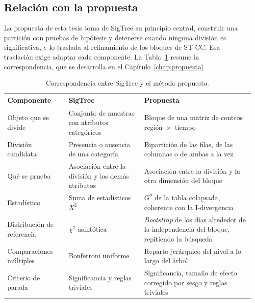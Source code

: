\subsection{Relación con la propuesta}\label{sec:sigtree-propuesta}

La propuesta de esta tesis toma de SigTree su principio central, construir una
partición con pruebas de hipótesis y detenerse cuando ninguna división es
significativa, y lo traslada al refinamiento de los bloques de ST-CC. Esa
traslación exige adaptar cada componente. La Tabla~\ref{tab:sigtree-astcc} resume
la correspondencia, que se desarrolla en el Capítulo~\ref{chap:propuesta}.

\begin{table}[ht]
  \centering
  {\footnotesize
  \begin{tabular}{@{}>{\raggedright\arraybackslash}p{}
                  >{\raggedright\arraybackslash}p{}
                  >{\raggedright\arraybackslash}p{}@{}}
    \toprule
    \textbf{Componente} & \textbf{SigTree} & \textbf{Propuesta} \\
    \midrule
    Objeto que se divide & Conjunto de muestras con atributos categóricos &
      Bloque de una matriz de conteos región~$\times$~tiempo \\
    División candidata & Presencia o ausencia de una categoría &
      Bipartición de las filas, de las columnas o de ambas a la vez \\
    Qué se prueba & Asociación entre la división y los demás atributos &
      Asociación entre la división y la otra dimensión del bloque \\
    Estadístico & Suma de estadísticos $X^2$ & $G^2$ de la tabla colapsada,
      coherente con la I-divergencia \\
    Distribución de referencia & $\chi^2$ asintótica & \emph{Bootstrap} de los días
      alrededor de la independencia del bloque, repitiendo la búsqueda \\
    Comparaciones múltiples & Bonferroni uniforme & Reparto jerárquico del nivel
      a lo largo del árbol \\
    Criterio de parada & Significancia y reglas triviales & Significancia, tamaño
      de efecto corregido por sesgo y reglas triviales \\
    \bottomrule
  \end{tabular}
  }
  \caption{Correspondencia entre SigTree \cite{Hu2025} y el método propuesto.}
  \label{tab:sigtree-astcc}
\end{table}

